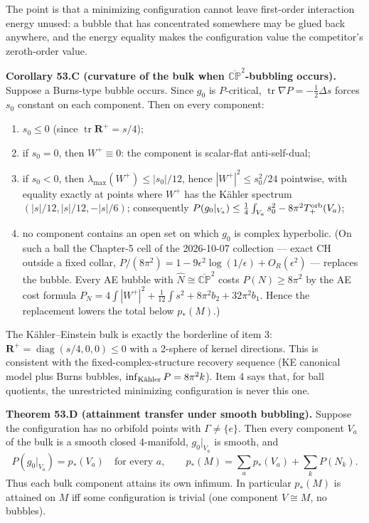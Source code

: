 \documentclass[
  10pt,
]{report}
\providecommand{\tightlist}{%
  \setlength{\itemsep}{0pt}\setlength{\parskip}{0pt}}
\begin{document}
The point is that a minimizing configuration cannot leave first-order
interaction energy unused: a bubble that has concentrated somewhere may
be glued back anywhere, and the energy equality makes the configuration
value the competitor's zeroth-order value.

\textbf{Corollary 53.C (curvature of the bulk when
\(\overline{\mathbb{CP}}^2\)-bubbling occurs).} Suppose a Burns-type
bubble occurs. Since \(g_0\) is \(P\)-critical,
\(\operatorname{tr}\nabla P=-\tfrac12\Delta s\) forces \(s_0\) constant
on each component. Then on every component:

\begin{enumerate}
\def\labelenumi{\arabic{enumi}.}
\tightlist
\item
  \(s_0\le0\) (since \(\operatorname{tr}\mathbf R^+=s/4\));
\item
  if \(s_0=0\), then \(W^+\equiv0\): the component is scalar-flat
  anti-self-dual;
\item
  if \(s_0<0\), then \(\lambda_{\max}(W^+)\le|s_0|/12\), hence
  \(|W^+|^2\le s_0^2/24\) pointwise, with equality exactly at points
  where \(W^+\) has the Kähler spectrum \((|s|/12,|s|/12,-|s|/6)\);
  consequently
  \(P(g_0|_{V_a})\le\tfrac14\int_{V_a}s_0^2-8\pi^2T_+^{\rm orb}(V_a)\);
\item
  no component contains an open set on which \(g_0\) is complex
  hyperbolic. (On such a ball the Chapter-5 cell of the 2026-10-07
  collection --- exact CH outside a fixed collar,
  \(P/(8\pi^2)=1-9\epsilon^2\log(1/\epsilon)+O_R(\epsilon^2)\) ---
  replaces the bubble. Every AE bubble with
  \(\widehat N\cong\overline{\mathbb{CP}}^2\) costs \(P(N)\ge8\pi^2\) by
  the AE cost formula
  \(P_N=4\int|W^+|^2+\tfrac1{12}\int s^2+8\pi^2b_2+32\pi^2b_1\). Hence
  the replacement lowers the total below \(p_*(M)\).)
\end{enumerate}

The Kähler--Einstein bulk is exactly the borderline of item 3:
\(\mathbf R^+=\operatorname{diag}(s/4,0,0)\le0\) with a 2-sphere of
kernel directions. This is consistent with the fixed-complex-structure
recovery sequence (KE canonical model plus Burns bubbles,
\(\inf_{\rm K\ddot ahler}P=8\pi^2k\)). Item 4 says that, for ball
quotients, the unrestricted minimizing configuration is never this one.

\textbf{Theorem 53.D (attainment transfer under smooth bubbling).}
Suppose the configuration has no orbifold points with
\(\Gamma\ne\{e\}\). Then every component \(V_a\) of the bulk is a smooth
closed 4-manifold, \(g_0|_{V_a}\) is smooth, and \[
P(g_0|_{V_a})=p_*(V_a)\quad\text{for every }a,\qquad p_*(M)=\sum_ap_*(V_a)+\sum_kP(N_k).
\] Thus each bulk component attains its own infimum. In particular
\(p_*(M)\) is attained on \(M\) iff some configuration is trivial (one
component \(V\cong M\), no bubbles).
\end{document}
